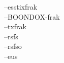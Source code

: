 \selectfont--\textrm{esstixfrak}\@all@characters\\
\selectfont--\textrm{BOONDOX-frak}\@all@characters\\
\selectfont--\textrm{txfrak}\@all@characters\\
\selectfont--\textrm{rsfs}\@all@characters\\
\selectfont--\textrm{rsfso}\@all@characters\\
\selectfont--\textrm{eus}\@all@characters\\
